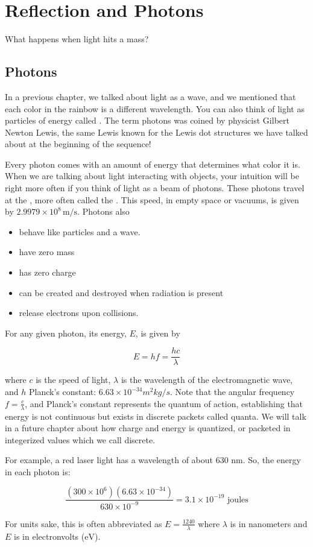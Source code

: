 \chapter{Reflection and Photons}
What happens when light hits a mass?
\section{Photons}
In a previous chapter, we talked about light as a wave, and we
mentioned that each color in the rainbow is a different
wavelength. You can also think of light as particles of energy called
. The term photons was coined by physicist Gilbert Newton Lewis, the same Lewis known for the Lewis dot structures we have talked about at the beginning of the sequence!

Every photon comes with an amount of energy that determines what color it is.
When we are talking about light interacting with objects, your
intuition will be right more often if you think of light as a beam of
photons. These photons travel at the , more often called the \textbf{}. This speed, in empty space or vacuums, is given by $2.9979 \times 10^8\,\textrm{m/s}$. Photons also
\begin{itemize}
  \item behave like particles and a wave.
  \item have zero mass 
  \item has zero charge
  \item can be created and destroyed when radiation is present
  \item release electrons upon collisions.
\end{itemize}


\begin{mdframed}[style=important, frametitle={Formula for energy of a photon}]

For any given photon, its energy, $E$, is given by

$$E = hf = \frac{h c}{\lambda}$$

where $c$ is the speed of light, $\lambda$ is the wavelength of the
electromagnetic wave, and $h$ Planck's constant: $6.63 \times 10^{-34} m^2 kg/s$. Note that the angular frequency $f = \frac{c}{\lambda}$, and Planck's constant represents the quantum of action, establishing that energy is not continuous but exists in discrete packets called quanta. We will talk in a future chapter about how charge and energy is quantized, or packeted in integerized values which we call discrete.

For example, a red laser light has a wavelength of about 630 nm. So, the energy in each photon is:

$$\frac{(300 \times 10^6) (6.63 \times 10^{-34})}{630 \times 10^{-9}} = 3.1 \times 10^{-19} \text{ joules}$$

For units sake, this is often abbreviated as $E = \frac{1240}{\lambda}$ where $\lambda$ is in nanometers and $E$ is in electronvolts ($\textrm{eV}$). 
\end{mdframed}


